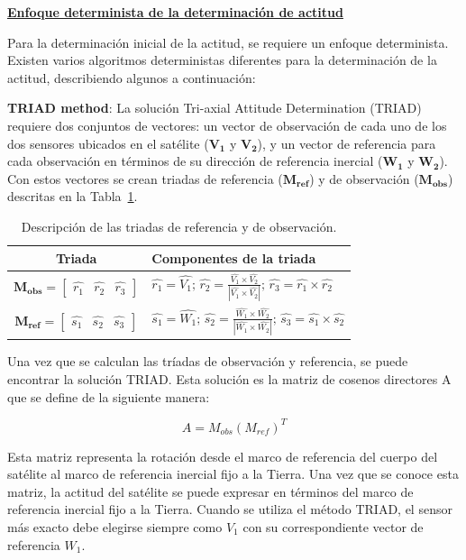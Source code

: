 \textbf{\underline{Enfoque determinista de la determinación de actitud}}

Para la determinación inicial de la actitud, se requiere un enfoque determinista. Existen varios algoritmos deterministas diferentes para la determinación de la actitud, describiendo algunos a continuación:

\textbf{TRIAD method}: La solución Tri-axial Attitude Determination (TRIAD) requiere dos conjuntos de vectores: un vector de observación de cada uno de los dos sensores ubicados en el satélite ($\mathbf{V_1}$ y $\mathbf{V_2}$), y un vector de referencia para cada observación en términos de su dirección de referencia inercial ($\mathbf{W_1}$ y $\mathbf{W_2}$). Con estos vectores se crean triadas de referencia ($\mathbf{M_{ref}}$) y de observación ($\mathbf{M_{obs}}$) descritas en la Tabla~\ref{tab:triad}.

\begin{table}[h!]
	\centering
	\caption{Descripción de las triadas de referencia y de observación.}
	\begin{tabular}{|c|p{10cm}|}
		\hline
		\textbf{Triada} & \textbf{Componentes de la triada} \\ \hline
		$\mathbf{M_{obs}} = \begin{bmatrix} \hat{r_1} & \hat{r_2} & \hat{r_3} \end{bmatrix}$ & $\hat{r_1} = \hat{V_1}; \, \hat{r_2} = \frac{\hat{V_1} \times \hat{V_2}}{|\hat{V_1} \times \hat{V_2}|}; \, \hat{r_3} = \hat{r_1} \times \hat{r_2}$ \\ \hline
		$\mathbf{M_{ref}} = \begin{bmatrix} \hat{s_1} & \hat{s_2} & \hat{s_3} \end{bmatrix}$ & $\hat{s_1} = \hat{W_1}; \, \hat{s_2} = \frac{\hat{W_1} \times \hat{W_2}}{|\hat{W_1} \times \hat{W_2}|}; \, \hat{s_3} = \hat{s_1} \times \hat{s_2}$ \\ \hline
	\end{tabular}
	\label{tab:triad}
\end{table}

Una vez que se calculan las tríadas de observación y referencia, se puede encontrar la solución TRIAD. Esta solución es la matriz de cosenos directores A que se define de la siguiente manera:

\[
A = M_{obs} (M_{ref})^T
\]

Esta matriz representa la rotación desde el marco de referencia del cuerpo del satélite al marco de referencia inercial fijo a la Tierra. Una vez que se conoce esta matriz, la actitud del satélite se puede expresar en términos del marco de referencia inercial fijo a la Tierra. Cuando se utiliza el método TRIAD, el sensor más exacto debe elegirse siempre como $V_1$ con su correspondiente vector de referencia $W_1$.

